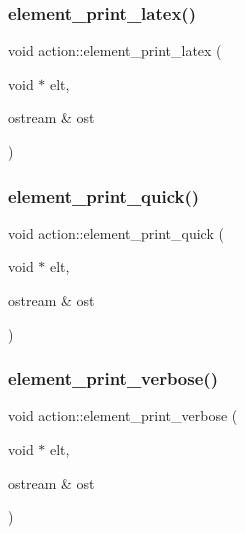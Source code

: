 \subsubsection{\texorpdfstring{element\+\_\+print\+\_\+latex()}{element\_print\_latex()}}
{\footnotesize\ttfamily void action\+::element\+\_\+print\+\_\+latex (\begin{DoxyParamCaption}\item[{void $\ast$}]{elt,  }\item[{ostream \&}]{ost }\end{DoxyParamCaption})}

\mbox{\label{classaction_a4844680cf6750396f76494a28655265b}} 
\subsubsection{\texorpdfstring{element\+\_\+print\+\_\+quick()}{element\_print\_quick()}}
{\footnotesize\ttfamily void action\+::element\+\_\+print\+\_\+quick (\begin{DoxyParamCaption}\item[{void $\ast$}]{elt,  }\item[{ostream \&}]{ost }\end{DoxyParamCaption})}

\mbox{\label{classaction_aa250fc6c8dbc621f4c3b298090bc110b}} 
\subsubsection{\texorpdfstring{element\+\_\+print\+\_\+verbose()}{element\_print\_verbose()}}
{\footnotesize\ttfamily void action\+::element\+\_\+print\+\_\+verbose (\begin{DoxyParamCaption}\item[{void $\ast$}]{elt,  }\item[{ostream \&}]{ost }\end{DoxyParamCaption})}

\mbox{\label{classaction_a3a9b830db9c47655eb086ab69734d527}} 
